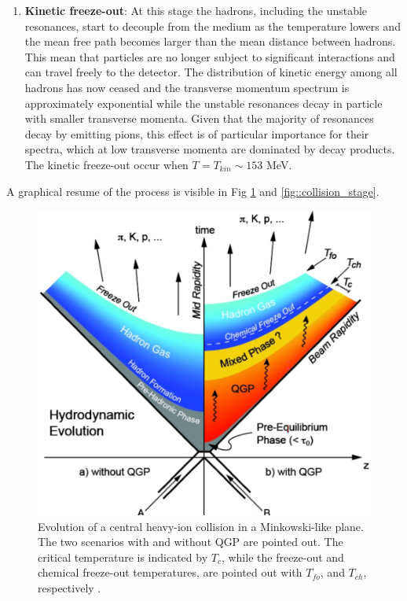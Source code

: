\documentclass[12pt,a4paper]{book}
\begin{document}
\begin{enumerate}
		\item \textbf{Kinetic freeze-out}: At this stage the hadrons, including the unstable resonances, start to decouple from the medium as the temperature lowers and the mean free path becomes larger than the mean distance between hadrons. This mean that particles are no longer subject to significant interactions and can travel freely to the detector. The distribution of kinetic energy among all hadrons has now ceased and the transverse momentum spectrum is approximately exponential while the unstable resonances decay in particle with smaller transverse momenta. Given that the majority of resonances decay by emitting pions, this effect is of particular importance for their spectra, which at low transverse momenta are dominated by decay products. The kinetic freeze-out occur when $T= T_{kin} \sim 153$ MeV. 

	\end{enumerate}
	A graphical resume of the process is visible in Fig \ref{fig:collision_stage_mikowsky} and \ref{fig::collision_stage}.  
	\begin{figure}[ht]
		\centering
		\includegraphics[width=0.5\linewidth]{pictures/collision_stage_mikowsky.png}
		\caption{Evolution of a central heavy-ion collision in a Minkowski-like plane. The two scenarios with and without QGP are pointed out. The critical temperature is indicated by $T_c$, while the freeze-out and chemical freeze-out temperatures, are pointed out with $T_{fo}$, and $T_{ch}$, respectively \cite{EvolutionofcollisionsandQGP}.}
		\label{fig:collision_stage_mikowsky} 
	\end{figure}
	
\end{document}
